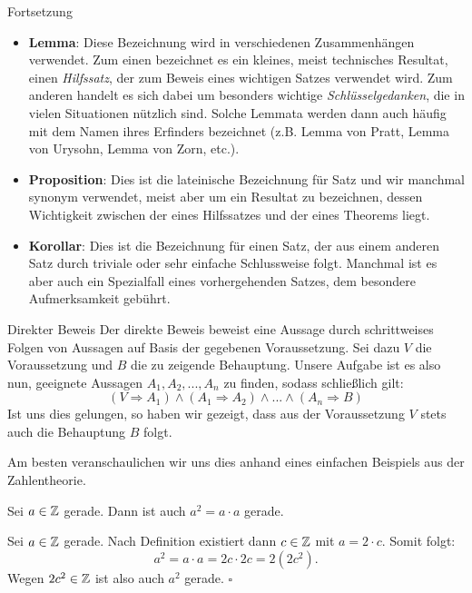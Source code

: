 \begin{frame}
\begin{block}{Fortsetzung}
\begin{itemize}
\item \textbf{Lemma}:
Diese Bezeichnung wird in verschiedenen Zusammenhängen verwendet.
Zum einen bezeichnet es ein kleines, meist technisches Resultat, einen
\textit{Hilfssatz}, der zum Beweis eines wichtigen Satzes verwendet wird.
Zum anderen handelt es sich dabei um besonders wichtige
\textit{Schlüsselgedanken}, die in vielen Situationen nützlich sind.
Solche Lemmata werden dann auch häufig mit dem Namen ihres Erfinders bezeichnet
(z.B. Lemma von Pratt, Lemma von Urysohn, Lemma von Zorn, etc.).

\item \textbf{Proposition}:
Dies ist die lateinische Bezeichnung für Satz und wir manchmal synonym
verwendet, meist aber um ein Resultat zu bezeichnen, dessen Wichtigkeit
zwischen der eines Hilfssatzes und der eines Theorems liegt.

\item \textbf{Korollar}:
Dies ist die Bezeichnung für einen Satz, der aus einem anderen Satz durch
triviale oder sehr einfache Schlussweise folgt.
Manchmal ist es aber auch ein Spezialfall eines vorhergehenden Satzes, dem
besondere Aufmerksamkeit gebührt.
\end{itemize}
\end{block}
\end{frame}


\begin{frame}{Direkter Beweis}
Der direkte Beweis beweist eine Aussage durch schrittweises Folgen von Aussagen
auf Basis der gegebenen Voraussetzung.
Sei dazu $V$ die Voraussetzung und $B$ die zu zeigende Behauptung.
Unsere Aufgabe ist es also nun, geeignete Aussagen $A_1, A_2,...,A_n$ zu
finden, sodass schließlich gilt:
\[
  (V \Rightarrow A_1) \wedge (A_1 \Rightarrow A_2) \wedge ... \wedge
  (A_n \Rightarrow B)
\]
Ist uns dies gelungen, so haben wir gezeigt, dass aus der Voraussetzung $V$
stets auch die Behauptung $B$ folgt.
\end{frame}


\begin{frame}
Am besten veranschaulichen wir uns dies anhand eines einfachen Beispiels aus
der Zahlentheorie.

\begin{proposition}
Sei $a \in \mathbb{Z}$ gerade.
Dann ist auch $a^2 = a \cdot a$ gerade.
\end{proposition}

\begin{proof*}
Sei $a \in \mathbb{Z}$ gerade.
Nach Definition existiert dann $c \in \mathbb{Z}$ mit $a = 2 \cdot c$.
Somit folgt:
\[
  a^2 = a \cdot a = 2c \cdot 2c = 2(2c^2).
\]
Wegen $2c^2 \in \mathbb{Z}$ ist also auch $a^2$ gerade.
\hfill $\square$
\end{proof*}
\end{frame}


